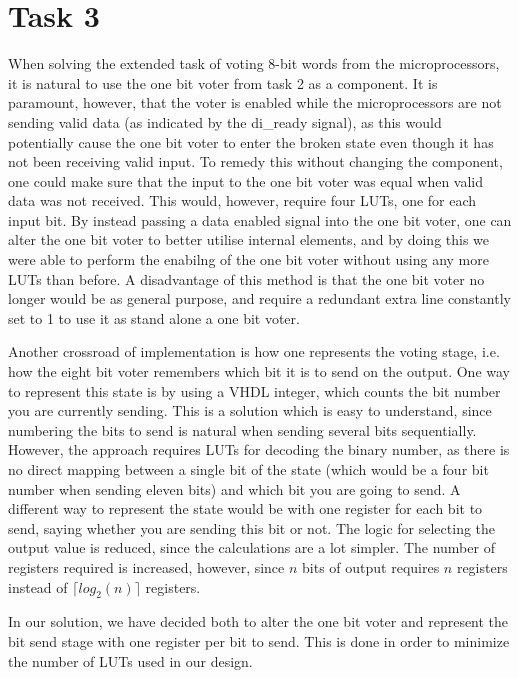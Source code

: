 \documentclass[11pt]{article}
\begin{document}
\section{Task 3}
\label{sec:task3}

When solving the extended task of voting 8-bit words from the
microprocessors, it is natural to use the one bit voter from task 2 as
a component. It is paramount, however, that the voter is enabled while
the microprocessors are not sending valid data (as indicated by the
di\_ready signal), as this would potentially cause the one bit voter
to enter the broken state even though it has not been receiving valid
input. To remedy this without changing the component, one could make
sure that the input to the one bit voter was equal when valid data was
not received. This would, however, require four LUTs, one for each
input bit. By instead passing a data enabled signal into the one bit
voter, one can alter the one bit voter to better utilise internal
elements, and by doing this we were able to perform the enabilng of
the one bit voter without using any more LUTs than before. A
disadvantage of this method is that the one bit voter no longer would
be as general purpose, and require a redundant extra line constantly
set to 1 to use it as stand alone a one bit voter.

Another crossroad of implementation is how one represents the voting
stage, i.e. how the eight bit voter remembers which bit it is to send
on the output. One way to represent this state is by using a VHDL
integer, which counts the bit number you are currently sending. This
is a solution which is easy to understand, since numbering the bits to
send is natural when sending several bits sequentially. However, the
approach requires LUTs for decoding the binary number, as there is no
direct mapping between a single bit of the state (which would be a
four bit number when sending eleven bits) and which bit you are going
to send. A different way to represent the state would be with one
register for each bit to send, saying whether you are sending this bit
or not. The logic for selecting the output value is reduced, since the
calculations are a lot simpler. The number of registers required is
increased, however, since $n$ bits of output requires $n$ registers
instead of $\lceil log_2(n) \rceil$ registers.

In our solution, we have decided both to alter the one bit voter and
represent the bit send stage with one register per bit to send. This
is done in order to minimize the number of LUTs used in our design. 
\end{document}
